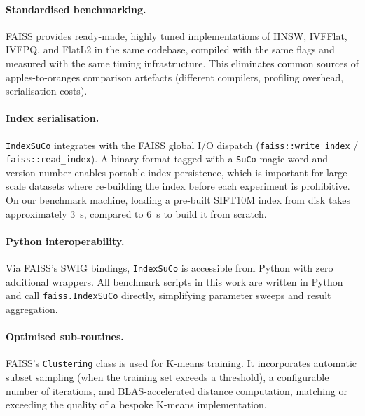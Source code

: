 \documentclass[11pt,a4paper]{article}
\begin{document}
\paragraph{Standardised benchmarking.}
FAISS provides ready-made, highly tuned implementations of HNSW, IVFFlat,
IVFPQ, and FlatL2 in the same codebase, compiled with the same flags and
measured with the same timing infrastructure.  This eliminates common sources
of apples-to-oranges comparison artefacts (different compilers, profiling
overhead, serialisation costs).

\paragraph{Index serialisation.}
\texttt{IndexSuCo} integrates with the FAISS global I/O dispatch
(\texttt{faiss::write\_index} / \texttt{faiss::read\_index}).  A binary format
tagged with a \texttt{SuCo} magic word and version number enables portable
index persistence, which is important for large-scale datasets where re-building
the index before each experiment is prohibitive.  On our benchmark machine,
loading a pre-built SIFT10M index from disk takes approximately $3$~s,
compared to $6$~s to build it from scratch.

\paragraph{Python interoperability.}
Via FAISS's SWIG bindings, \texttt{IndexSuCo} is accessible from Python with
zero additional wrappers.  All benchmark scripts in this work are written in
Python and call \texttt{faiss.IndexSuCo} directly, simplifying parameter
sweeps and result aggregation.

\paragraph{Optimised sub-routines.}
FAISS's \texttt{Clustering} class is used for K-means training.  It
incorporates automatic subset sampling (when the training set exceeds a
threshold), a configurable number of iterations, and BLAS-accelerated distance
computation, matching or exceeding the quality of a bespoke K-means
implementation.
\end{document}
